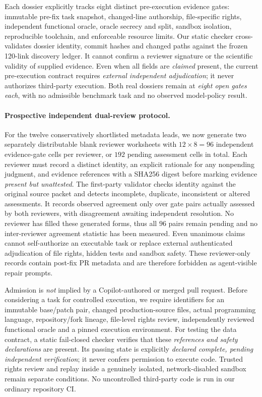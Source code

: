 \documentclass[pdflatex,sn-basic]{sn-jnl}
\begin{document}
Each dossier explicitly tracks eight distinct
pre-execution evidence gates: immutable pre-fix task
snapshot, changed-line authorship, file-specific
rights, independent functional oracle, oracle
secrecy and split, sandbox isolation, reproducible
toolchain, and enforceable resource limits.
Our static checker cross-validates dossier identity,
commit hashes and changed paths against the frozen
120-link discovery ledger. It cannot confirm
a reviewer signature or the scientific validity of
supplied evidence. Even when all fields are
\emph{claimed} present, the current pre-execution
contract requires \emph{external independent
adjudication}; it never authorizes third-party
execution. Both real dossiers remain at
\emph{eight open gates each}, with no admissible
benchmark task and no observed model-policy result.

\paragraph{Prospective independent dual-review protocol.}
For the twelve conservatively shortlisted metadata leads,
we now generate two separately distributable blank
reviewer worksheets with $12\times 8=96$
independent evidence-gate cells per reviewer,
or $192$ pending assessment cells in total.
Each reviewer must record a distinct identity,
an explicit rationale for any nonpending judgment,
and evidence references with a SHA256 digest before
marking evidence \emph{present but unattested}.
The first-party validator checks identity against
the original source packet and detects incomplete,
duplicate, inconsistent or altered assessments.
It records observed agreement only over gate
pairs actually assessed by both reviewers,
with disagreement awaiting independent resolution.
No reviewer has filled these generated forms,
thus all $96$ pairs remain pending and no
inter-reviewer agreement statistic has been measured.
Even unanimous claims cannot self-authorize an
executable task or replace external authenticated
adjudication of file rights, hidden tests and
sandbox safety. These reviewer-only records
contain post-fix PR metadata and are therefore
forbidden as agent-visible repair prompts.

Admission is \emph{not} implied by a Copilot-authored or merged pull
request. Before considering a task for controlled execution, we require
identifiers for an immutable base/patch pair, changed production-source
files, actual programming language, repository/fork lineage,
file-level rights review, independently reviewed functional oracle and
a pinned execution environment. For testing the data contract,
a static fail-closed checker verifies that these \emph{references and
safety declarations} are present. Its passing state is explicitly
\emph{declared complete, pending independent verification};
it never confers permission to execute code. Trusted rights review and
replay inside a genuinely isolated, network-disabled sandbox remain
separate conditions. No uncontrolled third-party code is run in our
ordinary repository CI.
\end{document}
